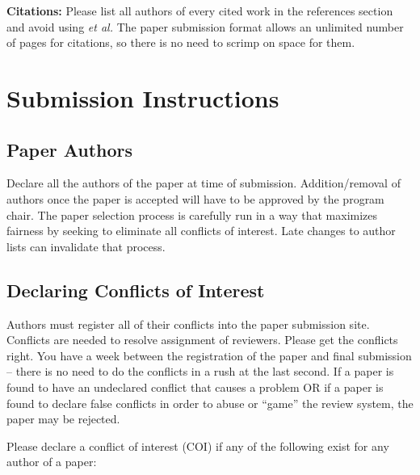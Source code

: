 \documentclass[pageno]{jpaper}
\begin{document}
\noindent\textbf{Citations:} Please list all authors of every cited
work in the references section and avoid using {\em et al.} The paper
submission format allows an unlimited number of pages for citations,
so there is no need to scrimp on space for them.

\section{Submission Instructions}

\subsection{Paper Authors}

Declare all the authors of the paper at time of submission.
Addition/removal of authors once the paper is accepted will have to be
approved by the program chair.  The paper selection process is
carefully run in a way that maximizes fairness by seeking to eliminate
all conflicts of interest.  Late changes to author lists can
invalidate that process.

\subsection{Declaring Conflicts of Interest}

Authors must register all of their conflicts into the paper submission
site.  Conflicts are needed to resolve assignment of reviewers.
Please get the conflicts right.  You have a week between the
registration of the paper and final submission -- there is no need to
do the conflicts in a rush at the last second. If a paper is found to
have an undeclared conflict that causes a problem OR if a paper is
found to declare false conflicts in order to abuse or ``game'' the
review system, the paper may be rejected.

Please declare a conflict of interest (COI) if any of the following
exist for any author of a paper:
\end{document}
